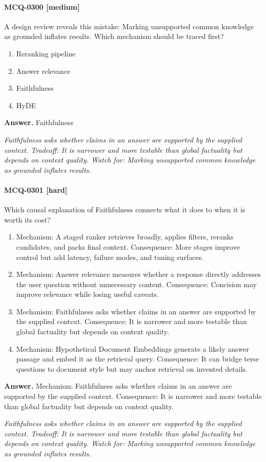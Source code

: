 \paragraph{MCQ-0300 [medium]} A design review reveals this mistake: Marking unsupported common knowledge as grounded inflates results. Which mechanism should be traced first?
\begin{enumerate}[label=\Alph*.]
\item Reranking pipeline
\item Answer relevance
\item Faithfulness
\item HyDE
\end{enumerate}
\noindent\textbf{Answer.} Faithfulness
\par\textit{Faithfulness asks whether claims in an answer are supported by the supplied context. Tradeoff: It is narrower and more testable than global factuality but depends on context quality. Watch for: Marking unsupported common knowledge as grounded inflates results.}
\paragraph{MCQ-0301 [hard]} Which causal explanation of Faithfulness connects what it does to when it is worth its cost?
\begin{enumerate}[label=\Alph*.]
\item Mechanism: A staged ranker retrieves broadly, applies filters, reranks candidates, and packs final context. Consequence: More stages improve control but add latency, failure modes, and tuning surfaces.
\item Mechanism: Answer relevance measures whether a response directly addresses the user question without unnecessary content. Consequence: Concision may improve relevance while losing useful caveats.
\item Mechanism: Faithfulness asks whether claims in an answer are supported by the supplied context. Consequence: It is narrower and more testable than global factuality but depends on context quality.
\item Mechanism: Hypothetical Document Embeddings generate a likely answer passage and embed it as the retrieval query. Consequence: It can bridge terse questions to document style but may anchor retrieval on invented details.
\end{enumerate}
\noindent\textbf{Answer.} Mechanism: Faithfulness asks whether claims in an answer are supported by the supplied context. Consequence: It is narrower and more testable than global factuality but depends on context quality.
\par\textit{Faithfulness asks whether claims in an answer are supported by the supplied context. Tradeoff: It is narrower and more testable than global factuality but depends on context quality. Watch for: Marking unsupported common knowledge as grounded inflates results.}
